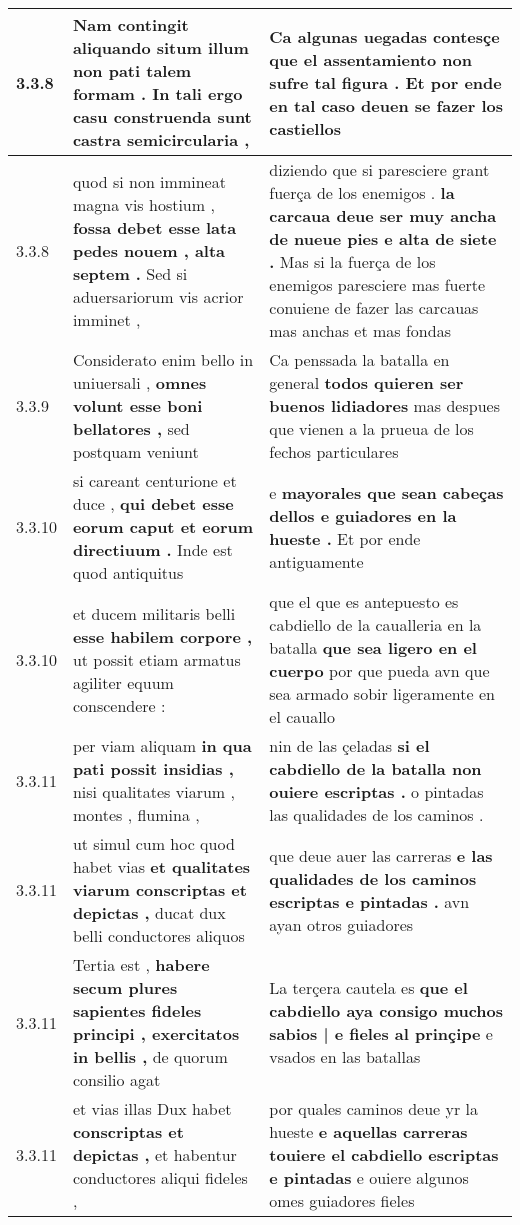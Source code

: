 \begin{tabular}{|p{1cm}|p{6.5cm}|p{6.5cm}|}
3.3.8 & Nam contingit aliquando situm \textbf{ illum non pati talem formam . } In tali ergo casu construenda sunt castra semicircularia , & Ca algunas uegadas \textbf{ contesçe que el assentamiento non sufre tal figura . } Et por ende en tal caso deuen se fazer los castiellos \\\hline
3.3.8 & quod si non immineat magna vis hostium , \textbf{ fossa debet esse lata pedes nouem , alta septem . } Sed si aduersariorum vis acrior imminet , & diziendo que si paresciere grant fuerça de los enemigos . \textbf{ la carcaua deue ser muy ancha de nueue pies e alta de siete . } Mas si la fuerça de los enemigos paresciere mas fuerte conuiene de fazer las carcauas mas anchas et mas fondas \\\hline
3.3.9 & Considerato enim bello in uniuersali , \textbf{ omnes volunt esse boni bellatores , } sed postquam veniunt & Ca penssada la batalla en general \textbf{ todos quieren ser buenos lidiadores } mas despues que vienen a la prueua de los fechos particulares \\\hline
3.3.10 & si careant centurione et duce , \textbf{ qui debet esse eorum caput et eorum directiuum . } Inde est quod antiquitus & e \textbf{ mayorales que sean cabeças dellos e guiadores en la hueste . } Et por ende antiguamente \\\hline
3.3.10 & et ducem militaris belli \textbf{ esse habilem corpore , } ut possit etiam armatus agiliter equum conscendere : & que el que es antepuesto es cabdiello de la caualleria en la batalla \textbf{ que sea ligero en el cuerpo } por que pueda avn que sea armado sobir ligeramente en el cauallo \\\hline
3.3.11 & per viam aliquam \textbf{ in qua pati possit insidias , } nisi qualitates viarum , montes , flumina , & nin de las çeladas \textbf{ si el cabdiello de la batalla non ouiere escriptas . } o pintadas las qualidades de los caminos . \\\hline
3.3.11 & ut simul cum hoc quod habet vias \textbf{ et qualitates viarum conscriptas et depictas , } ducat dux belli conductores aliquos & que deue auer las carreras \textbf{ e las qualidades de los caminos escriptas e pintadas . } avn ayan otros guiadores \\\hline
3.3.11 & Tertia est , \textbf{ habere secum plures sapientes fideles principi , exercitatos in bellis , } de quorum consilio agat & La terçera cautela es \textbf{ que el cabdiello aya consigo muchos sabios | e fieles al prinçipe } e vsados en las batallas \\\hline
3.3.11 & et vias illas Dux habet \textbf{ conscriptas et depictas , } et habentur conductores aliqui fideles , & por quales caminos deue yr la hueste \textbf{ e aquellas carreras touiere el cabdiello escriptas e pintadas } e ouiere algunos omes guiadores fieles \\\hline

\end{tabular}
